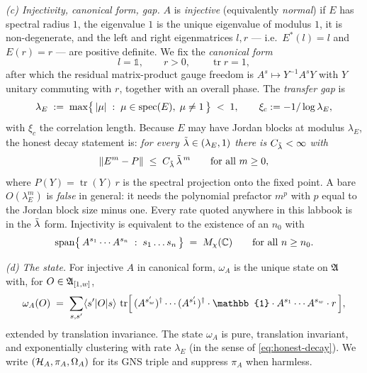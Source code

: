\begin{definition}
\emph{(c) Injectivity, canonical form, gap.} $A$ is \emph{injective}
(equivalently \emph{normal}) if $E$ has spectral radius $1$, the eigenvalue $1$
is the unique eigenvalue of modulus $1$, it is non-degenerate, and the left and
right eigenmatrices $l, r$ --- i.e.\ $E^{*}(l) = l$ and $E(r) = r$ --- are
positive definite. We fix the \emph{canonical form}
\begin{equation}
  l = \mathbb{1}, \qquad r > 0, \qquad \operatorname{tr} r = 1 ,
\end{equation}
after which the residual matrix-product gauge freedom is
$A^{s} \mapsto Y^{-1} A^{s} Y$ with $Y$ unitary commuting with $r$, together
with an overall phase. The \emph{transfer gap} is
\begin{equation}
  \lambda_{E} \; := \; \max \bigl\{\, \lvert \mu\rvert \;:\; \mu \in \operatorname{spec}(E), \;
  \mu \neq 1 \,\bigr\} \; < \; 1 ,
  \qquad \xi_{c} := -1/\log \lambda_{E} ,
\end{equation}
with $\xi_{c}$ the correlation length. Because $E$ may have Jordan blocks at
modulus $\lambda_{E}$, the honest decay statement is: \emph{for every
$\tilde{\lambda} \in (\lambda_{E},1)$ there is $C_{\tilde{\lambda}} < \infty$ with}
\begin{equation}
  \lVert E^{m} - P\rVert \;\le\; C_{\tilde{\lambda}} \, \tilde{\lambda}^{\,m}
  \qquad \text{for all } m \ge 0,
  \label{eq:honest-decay}
\end{equation}
where $P(Y) = \operatorname{tr}(Y)\, r$ is the spectral projection onto the
fixed point. A bare $O(\lambda_{E}^{m})$ is \emph{false} in general: it needs
the polynomial prefactor $m^{p}$ with $p$ equal to the Jordan block size minus
one. Every rate quoted anywhere in this labbook is in the $\tilde{\lambda}$ form.
Injectivity is equivalent to the existence of an $n_{0}$ with
\begin{equation}
  \operatorname{span}\bigl\{\, A^{s_{1}} \cdots A^{s_{n}} \;:\;
  s_{1} \ldots s_{n} \,\bigr\} \;=\; M_{\chi}(\mathbb{C})
  \qquad \text{for all } n \ge n_{0} .
  \label{eq:word-spanning}
\end{equation}

\emph{(d) The state.} For injective $A$ in canonical form, $\omega_{A}$ is the
unique state on $\mathfrak{A}$ with, for $O \in \mathfrak{A}_{[1,w]}$,
\begin{equation}
  \omega_{A}(O) \;=\; \sum_{s,s'} \bra{s'} O \ket{s} \,
  \operatorname{tr}\Bigl[\, (A^{s'_{w}})^{\dagger} \cdots (A^{s'_{1}})^{\dagger}
  \cdot \mathbb{1} \cdot A^{s_{1}} \cdots A^{s_{w}} \cdot r \,\Bigr],
\end{equation}
extended by translation invariance. The state $\omega_{A}$ is pure,
translation invariant, and exponentially clustering with rate $\lambda_{E}$
(in the sense of \eqref{eq:honest-decay}). We write
$(\mathcal{H}_{A}, \pi_{A}, \Omega_{A})$ for its GNS triple and suppress $\pi_{A}$
when harmless.
\end{definition}


